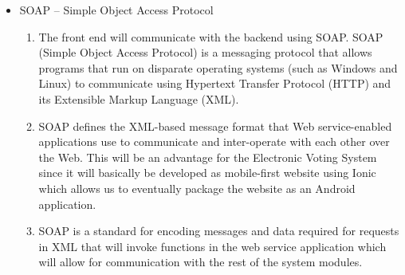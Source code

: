 \begin{itemize}
		\item SOAP – Simple Object Access Protocol
		\begin{enumerate}
			\item The front end will communicate with the backend using SOAP. SOAP (Simple Object Access Protocol) is a messaging protocol that allows programs that run on disparate operating systems (such as Windows and Linux) to communicate using Hypertext Transfer Protocol (HTTP) and its Extensible Markup Language (XML).
			
			\item SOAP defines the XML-based message format that Web service-enabled applications use to communicate and inter-operate with each other over the Web. This will be an advantage for the Electronic Voting System since it will basically be developed as mobile-first website using Ionic which allows us to eventually package the website as an Android application. 
			
			\item SOAP is a standard for encoding messages and data required for requests in XML that will invoke functions in the web service application which will allow for communication with the rest of the system modules.
		\end{enumerate}
\end{itemize}